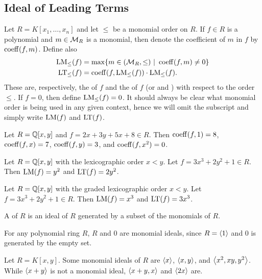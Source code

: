 \subsection{Ideal of Leading Terms}

Let $R = K[x_1, \ldots, x_n]$ and let $\leq$ be a monomial order on $R$.
If $f \in R$ is a polynomial and $m \in \cal M_R$ is a monomial,
then denote the coefficient of $m$ in $f$ by $\coeff(f, m)$.
Define also
\begin{align*}
  \LM_\leq(f) &= \max\{ m \in (\cal M_R, \leq) ~|~ \coeff(f, m) \neq 0\} \\
  \LT_\leq(f) &= \coeff(f, \LM_\leq(f)) \cdot \LM_\leq(f).
\end{align*}
These are, respectively, the  of $f$ and the  of $f$
(or  and )
with respect to the order $\leq$.
If $f = 0$, then define $\LM_\leq(f) = 0$.
It should always be clear what monomial order is being used in any given context, 
hence we will omit the subscript and simply write $\LM(f)$ and $\LT(f)$.

\begin{example}
  Let $R = \bb Q[x,y]$ and $f = 2x + 3y + 5x + 8 \in R$.
  Then $\coeff(f, 1) = 8$, $\coeff(f, x) = 7$, $\coeff(f, y) = 3$, and $\coeff(f, x^2) = 0$.
\end{example}
\begin{example}
  Let $R = \bb Q[x,y]$ with the lexicographic order $x < y$.
  Let $f = 3x^3 + 2y^2 + 1 \in R$.
  Then $\LM(f) = y^2$ and $\LT(f) = 2y^2$.
\end{example}
\begin{example}
  Let $R = \bb Q[x,y]$ with the graded lexicographic order $x < y$.
  Let $f = 3x^3 + 2y^2 + 1 \in R$.
  Then $\LM(f) = x^3$ and $\LT(f) = 3x^3$.
\end{example}

A  of $R$ is an ideal of $R$ generated by a subset of the monomials of $R$.
\begin{example}
  For any polynomial ring $R$, $R$ and $0$ are monomial ideals,
  since $R = \pid 1$ and $0$ is generated by the empty set.
\end{example}
\begin{example}
  Let $R = K[x,y]$.
  Some monomial ideals of $R$ are $\pid x$, $\pid{x,y}$, and $\pid{x^2, xy, y^2}$.
  While $\pid{x + y}$ is not a monomial ideal, $\pid{x + y, x}$ and $\pid{2x}$ are.
\end{example}

